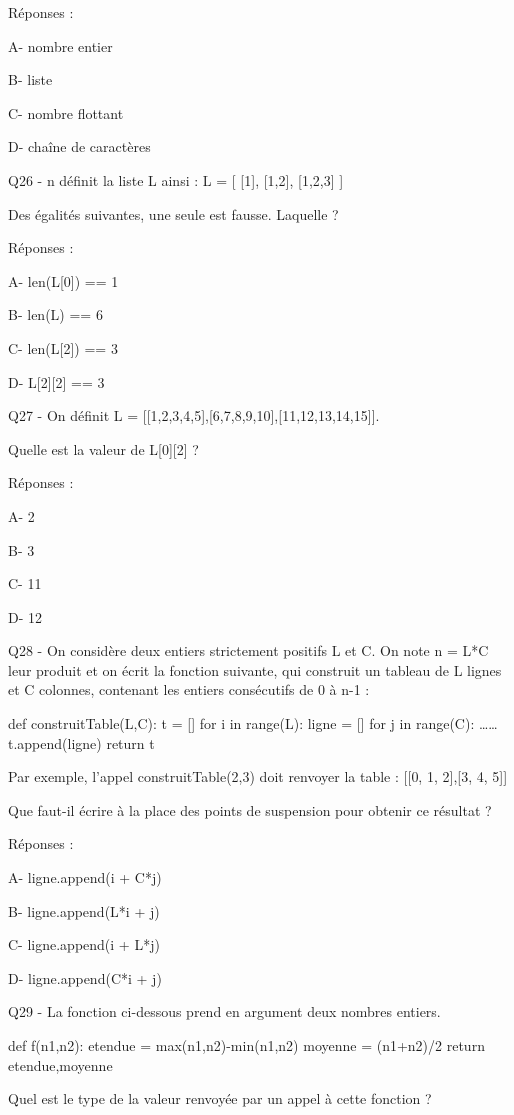 \documentclass[
]{book}
\begin{document}
Réponses :

A- nombre entier

B- liste

C- nombre flottant

D- chaîne de caractères

Q26 - n définit la liste L ainsi : L = {[} {[}1{]}, {[}1,2{]}, {[}1,2,3{]} {]}

Des égalités suivantes, une seule est fausse. Laquelle ?

Réponses :

A- len(L{[}0{]}) == 1

B- len(L) == 6

C- len(L{[}2{]}) == 3

D- L{[}2{]}{[}2{]} == 3

Q27 - On définit L = {[}{[}1,2,3,4,5{]},{[}6,7,8,9,10{]},{[}11,12,13,14,15{]}{]}.

Quelle est la valeur de L{[}0{]}{[}2{]} ?

Réponses :

A- 2

B- 3

C- 11

D- 12

Q28 - On considère deux entiers strictement positifs L et C. On note n = L*C leur produit et on écrit la fonction suivante, qui construit un tableau de L lignes et C colonnes, contenant les entiers consécutifs de 0 à n-1 :

def construitTable(L,C):
t = {[}{]}
for i in range(L):
ligne = {[}{]}
for j in range(C):
\ldots\ldots{}
t.append(ligne)
return t

Par exemple, l'appel construitTable(2,3) doit renvoyer la table : {[}{[}0, 1, 2{]},{[}3, 4, 5{]}{]}

Que faut-il écrire à la place des points de suspension pour obtenir ce résultat ?

Réponses :

A- ligne.append(i + C*j)

B- ligne.append(L*i + j)

C- ligne.append(i + L*j)

D- ligne.append(C*i + j)

Q29 - La fonction ci-dessous prend en argument deux nombres entiers.

def f(n1,n2):
etendue = max(n1,n2)-min(n1,n2)
moyenne = (n1+n2)/2
return etendue,moyenne

Quel est le type de la valeur renvoyée par un appel à cette fonction ?
\end{document}
